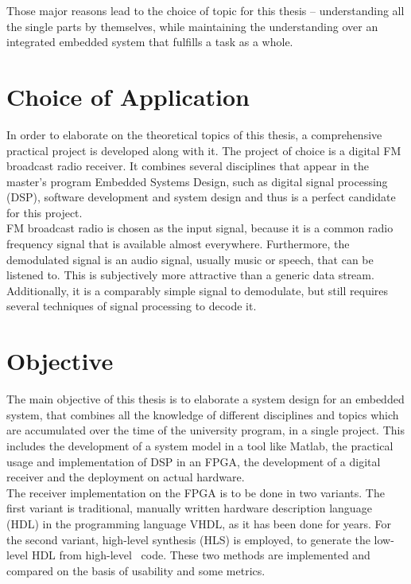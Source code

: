 Those major reasons lead to the choice of topic for this thesis -- understanding all the single parts by themselves, while maintaining the understanding over an integrated embedded system that fulfills a task as a whole.

\section{Choice of Application}

In order to elaborate on the theoretical topics of this thesis, a comprehensive practical project is developed along with it.
The project of choice is a digital FM broadcast radio receiver.
It combines several disciplines that appear in the master's program Embedded Systems Design, such as digital signal processing (DSP), software development and system design and thus is a perfect candidate for this project.\\

FM broadcast radio is chosen as the input signal, because it is a common radio frequency signal that is available almost everywhere.
Furthermore, the demodulated signal is an audio signal, usually music or speech, that can be listened to.
This is subjectively more attractive than a generic data stream.
Additionally, it is a comparably simple signal to demodulate, but still requires several techniques of signal processing to decode it.

\section{Objective}

The main objective of this thesis is to elaborate a system design for an embedded system, that combines all the knowledge of different disciplines and topics which are accumulated over the time of the university program, in a single project.
This includes the development of a system model in a tool like Matlab, the practical usage and implementation of DSP in an FPGA, the development of a digital receiver and the deployment on actual hardware.\\

The receiver implementation on the FPGA is to be done in two variants.
The first variant is traditional, manually written hardware description language (HDL) in the programming language VHDL, as it has been done for years.
For the second variant, high-level synthesis (HLS) is employed, to generate the low-level HDL from high-level \cplusplus\ code.
These two methods are implemented and compared on the basis of usability and some metrics.\\

